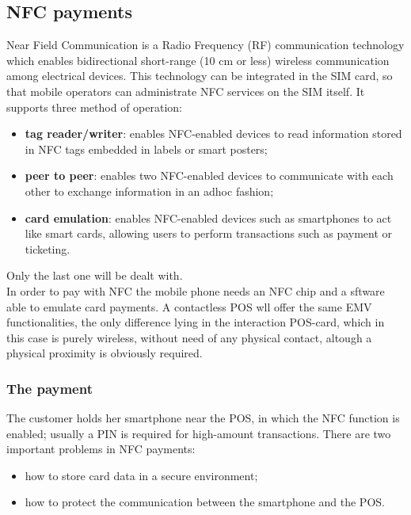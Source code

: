 \documentclass[a4paper, 10pt, titlepage]{article}
\begin{document}
\subsection{NFC payments}
Near Field Communication is a Radio Frequency (RF) communication technology which enables bidirectional short-range (10 cm or less) wireless communication among electrical devices. This technology can be integrated in the SIM card, so that mobile operators can administrate NFC services on the SIM itself. It supports three method of operation: 
\begin{itemize}
\item \textbf{tag reader/writer}: enables NFC-enabled devices to read information stored in NFC tags embedded in labels or smart posters;
\item \textbf{peer to peer}: enables two NFC-enabled devices to communicate with each other to exchange information in an adhoc fashion;
\item \textbf{card emulation}: enables NFC-enabled devices such as smartphones to act like smart cards, allowing users to perform transactions such as payment or ticketing.
\end{itemize}
Only the last one will be dealt with. \medskip\\
In order to pay with NFC the mobile phone needs an NFC chip and a sftware able to emulate card payments. A contactless POS wll offer the same EMV functionalities, the only difference lying in the interaction POS-card, which in this case is purely wireless, without need of any physical contact, altough a physical proximity is obviously required.

\subsubsection{The payment}
The customer holds her smartphone near the POS, in which the NFC function is enabled; usually a PIN is required for high-amount transactions. There are two important problems in NFC payments:
\begin{itemize}
\item how to store card data in a secure environment;
\item how to protect the communication between the smartphone and the POS.
\end{itemize}
\end{document}
